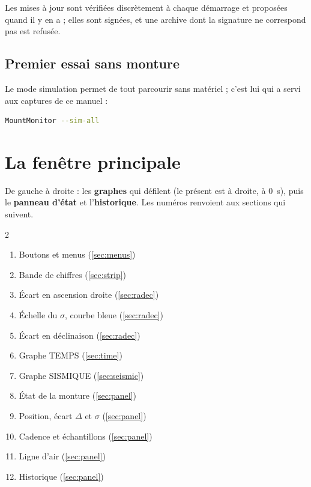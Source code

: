 Les mises à jour sont vérifiées discrètement à chaque démarrage et proposées
quand il y en a ; elles sont signées, et une archive dont la signature ne
correspond pas est refusée.

\section{Premier essai sans monture}

Le mode simulation permet de tout parcourir sans matériel ; c'est lui qui a
servi aux captures de ce manuel :

\begin{lstlisting}[language=bash]
MountMonitor --sim-all
\end{lstlisting}

\chapter{La fenêtre principale}
\label{ch:window}


De gauche à droite : les \textbf{graphes} qui défilent (le présent est à
droite, à 0~s), puis le \textbf{panneau d'état} et l'\textbf{historique}.
Les numéros renvoient aux sections qui suivent.

\begin{multicols}{2}
\begin{enumerate}
  \item Boutons et menus (\ref{sec:menus})
  \item Bande de chiffres (\ref{sec:strip})
  \item Écart en ascension droite (\ref{sec:radec})
  \item Échelle du $\sigma$, courbe bleue (\ref{sec:radec})
  \item Écart en déclinaison (\ref{sec:radec})
  \item Graphe TEMPS (\ref{sec:time})
  \item Graphe SISMIQUE (\ref{sec:seismic})
  \item État de la monture (\ref{sec:panel})
  \item Position, écart $\Delta$ et $\sigma$ (\ref{sec:panel})
  \item Cadence et échantillons (\ref{sec:panel})
  \item Ligne d'air (\ref{sec:panel})
  \item Historique (\ref{sec:panel})
\end{enumerate}
\end{multicols}

